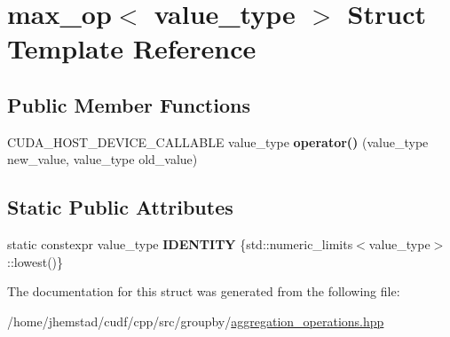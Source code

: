\hypertarget{structmax__op}{}\section{max\+\_\+op$<$ value\+\_\+type $>$ Struct Template Reference}
\label{structmax__op}
\subsection*{Public Member Functions}
\begin{DoxyCompactItemize}
\item 
C\+U\+D\+A\+\_\+\+H\+O\+S\+T\+\_\+\+D\+E\+V\+I\+C\+E\+\_\+\+C\+A\+L\+L\+A\+B\+LE value\+\_\+type {\bfseries operator()} (value\+\_\+type new\+\_\+value, value\+\_\+type old\+\_\+value)\hypertarget{structmax__op_aab482cfcb80c74381caa79215029eb3d}{}\label{structmax__op_aab482cfcb80c74381caa79215029eb3d}

\end{DoxyCompactItemize}
\subsection*{Static Public Attributes}
\begin{DoxyCompactItemize}
\item 
static constexpr value\+\_\+type {\bfseries I\+D\+E\+N\+T\+I\+TY} \{std\+::numeric\+\_\+limits$<$value\+\_\+type$>$\+::lowest()\}\hypertarget{structmax__op_af78a4123cafc239eec6c519b1cf8bdb3}{}\label{structmax__op_af78a4123cafc239eec6c519b1cf8bdb3}

\end{DoxyCompactItemize}


The documentation for this struct was generated from the following file\+:\begin{DoxyCompactItemize}
\item 
/home/jhemstad/cudf/cpp/src/groupby/\hyperlink{aggregation__operations_8hpp}{aggregation\+\_\+operations.\+hpp}\end{DoxyCompactItemize}
